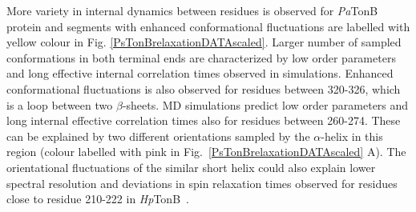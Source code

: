\documentclass[pre,aps,floatfix,authordate1-4,twocolumn]{revtex4-1}
\begin{document}
More variety in internal dynamics between residues is observed for {\it Pa}TonB
protein
and segments with enhanced conformational fluctuations are labelled with yellow colour
in Fig. \ref{PsTonBrelaxationDATAscaled}.
Larger number of sampled conformations in both terminal ends
are characterized by low order parameters and long effective internal correlation times
observed in simulations. 
Enhanced conformational fluctuations is also observed for residues between 320-326,
which is a loop between two $\beta$-sheets.
MD simulations predict low order parameters and long internal effective correlation
times also for residues between 260-274. These can be explained by  
two different orientations sampled by the $\alpha$-helix in this region
(colour labelled with pink in Fig.~\ref{PsTonBrelaxationDATAscaled} A).
The orientational fluctuations of the similar short helix could also explain 
lower spectral resolution and deviations in spin relaxation times
observed for residues close to residue 210-222 in {\it Hp}TonB~\cite{ciragan16}.
\end{document}

